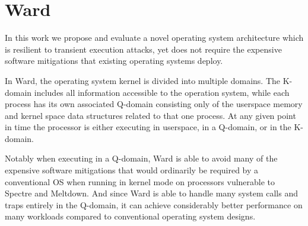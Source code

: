 \section*{Ward}
In this work we propose and evaluate a novel operating system architecture which is resilient to transient execution attacks, yet does not require the expensive software mitigations that existing operating systems deploy. 

In Ward, the operating system kernel is divided into multiple domains.
The K-domain includes all information accessible to the operation system, while each process has its own associated Q-domain consisting only of the userspace memory and kernel space data structures related to that one process.
At any given point in time the processor is either executing in userspace, in a Q-domain, or in the K-domain. 

Notably when executing in a Q-domain, Ward is able to avoid many of the expensive software mitigations that would ordinarily be required by a conventional OS when running in kernel mode on processors vulnerable to Spectre and Meltdown.
And since Ward is able to handle many system calls and traps entirely in the Q-domain, it can achieve considerably better performance on many workloads compared to conventional operating system designs.
